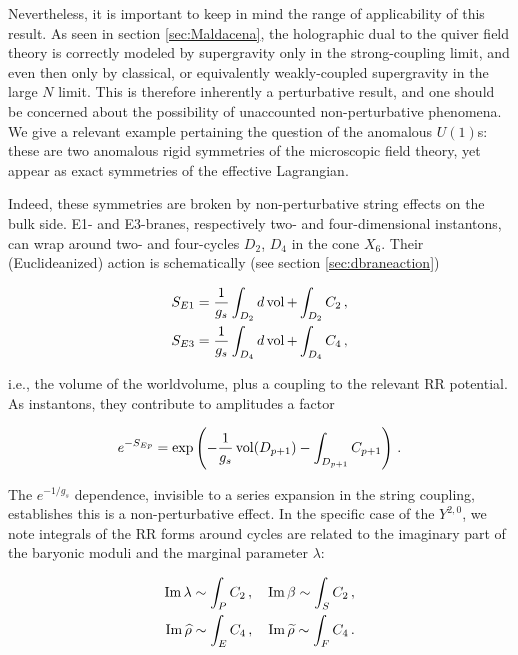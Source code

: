 Nevertheless, it is important to keep in mind the range of applicability of this result. As seen in section \ref{sec:Maldacena}, the holographic dual to the quiver field theory is correctly modeled by supergravity only in the strong-coupling limit, and even then only by classical, or equivalently weakly-coupled supergravity in the large $N$ limit. This is therefore inherently a perturbative result, and one should be concerned about the possibility of unaccounted non-perturbative phenomena. We give a relevant example pertaining the question of the anomalous $U(1)$s: these are two anomalous rigid symmetries of the microscopic field theory, yet appear as exact symmetries of the effective Lagrangian.

Indeed, these symmetries are broken by non-perturbative string effects on the bulk side. E1- and E3-branes, respectively two- and four-dimensional instantons, can wrap around two- and four-cycles $D_2$, $D_4$ in the cone $X_6$. Their (Euclideanized) action is schematically (see section \ref{sec:dbraneaction})

\begin{align}
\begin{split}
	S_{E1} = \frac{1}{g_s}\int_{D_2} d\operatorname{vol} + \int_{D_2} C_2\,,\\
	S_{E3} = \frac{1}{g_s}\int_{D_4} d\operatorname{vol} + \int_{D_4} C_4\,,
	\label{epaction}
\end{split}
\end{align}

i.e., the volume of the worldvolume, plus a coupling to the relevant RR potential. As instantons, they contribute to amplitudes a factor

\begin{equation}
	e^{-S_{Ep}} = \exp\left({-\frac{1}{g_s}\operatorname{vol}(D_{p+1}) - \int_{D_{p+1}} C_{p+1} }\right)\,.
\end{equation}

The $e^{-1/g_s}$ dependence, invisible to a series expansion in the string coupling, establishes this is a non-perturbative effect. In the specific case of the $Y^{2,0}$, we note integrals of the RR forms around cycles are related to the imaginary part of the baryonic moduli and the marginal parameter $\lambda$:

\begin{align}
\begin{split}
	\operatorname{Im} \lambda \sim \int_{P} C_2\,,\quad	\operatorname{Im} \beta \sim \int_{S} C_2\,, \\
	\operatorname{Im} \widehat{\rho} \sim \int_{E} C_4\,,\quad	\operatorname{Im} \widetilde{\rho} \sim \int_{F} C_4\,.
\end{split}
\end{align}

